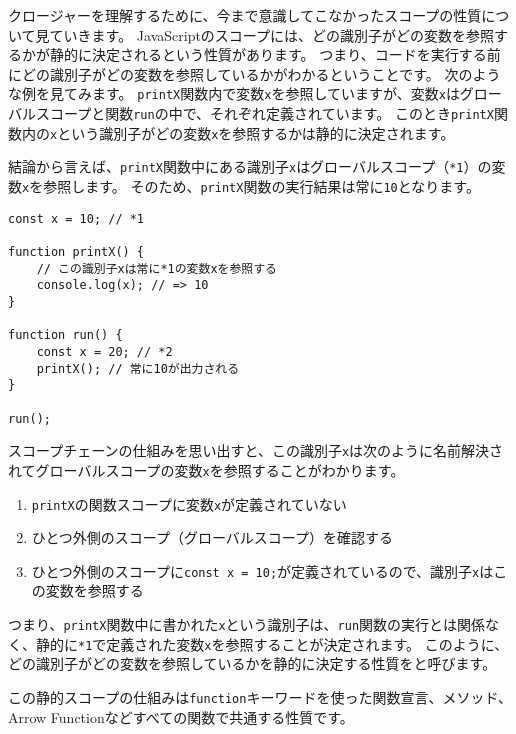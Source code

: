 クロージャーを理解するために、今まで意識してこなかったスコープの性質について見ていきます。
JavaScriptのスコープには、どの識別子がどの変数を参照するかが静的に決定されるという性質があります。
つまり、コードを実行する前にどの識別子がどの変数を参照しているかがわかるということです。
\newpage
次のような例を見てみます。
\texttt{printX}関数内で変数\texttt{x}を参照していますが、変数\texttt{x}はグローバルスコープと関数\texttt{run}の中で、それぞれ定義されています。
このとき\texttt{printX}関数内の\texttt{x}という識別子がどの変数\texttt{x}を参照するかは静的に決定されます。

結論から言えば、\texttt{printX}関数中にある識別子\texttt{x}はグローバルスコープ（\texttt{*1}）の変数\texttt{x}を参照します。
そのため、\texttt{printX}関数の実行結果は常に\texttt{10}となります。

\begin{lstlisting}
const x = 10; // *1

function printX() {
    // この識別子xは常に*1の変数xを参照する
    console.log(x); // => 10
}

function run() {
    const x = 20; // *2
    printX(); // 常に10が出力される
}

run();
\end{lstlisting}

スコープチェーンの仕組みを思い出すと、この識別子\texttt{x}は次のように名前解決されてグローバルスコープの変数\texttt{x}を参照することがわかります。

\begin{enumerate}
\def\labelenumi{\arabic{enumi}.}
\item
  \texttt{printX}の関数スコープに変数\texttt{x}が定義されていない
\item
  ひとつ外側のスコープ（グローバルスコープ）を確認する
\item
  ひとつ外側のスコープに\texttt{const x = 10;}が定義されているので、識別子\texttt{x}はこの変数を参照する
\end{enumerate}

つまり、\texttt{printX}関数中に書かれた\texttt{x}という識別子は、\texttt{run}関数の実行とは関係なく、静的に\texttt{*1}で定義された変数\texttt{x}を参照することが決定されます。
このように、どの識別子がどの変数を参照しているかを静的に決定する性質を\textbf{}と呼びます。

この静的スコープの仕組みは\texttt{function}キーワードを使った関数宣言、メソッド、Arrow
Functionなどすべての関数で共通する性質です。

